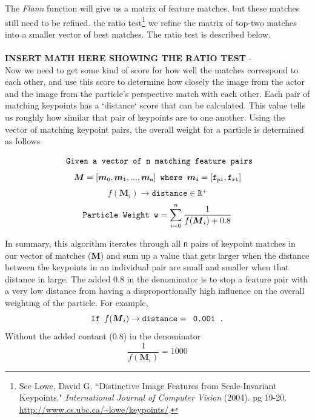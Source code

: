 \documentclass[a4paper,11pt]{article}
\begin{document}
 The \emph{Flann} function will give us a matrix of feature matches, but these matches still need to be refined. the ratio test\footnote{See Lowe, David G. ``Distinctive Image Features from Scale-Invariant Keypoints." {\it International Journal of Computer Vision} (2004). pg 19-20.  \url{http://www.cs.ubc.ca/~lowe/keypoints/}.} we refine the matrix of top-two matches into a smaller vector of best matches. The ratio test is described below.
\\ \\
 \textbf{INSERT MATH HERE SHOWING THE RATIO TEST}
-\\
  Now we need to get some kind of score for how well the matches correspond to each other, and use this score to determine how closely the image from the actor and the image from the particle's perspective match with each other. Each pair of matching keypoints has a `distance` score that can be calculated. This value tells us roughly how similar that pair of keypoints are to one another. Using the vector of matching keypoint pairs, the overall weight for a particle is determined as follows

\[  \verb. Given a vector of . \mathtt{n} \verb. matching feature pairs. \]
\[  \boldsymbol{M} = \mathtt{ [\boldsymbol{m}_0, \boldsymbol{m}_1, ... , \boldsymbol{m}_n} ]  \verb. where . \boldsymbol{m_i} = \mathtt{ \mathtt{[f_{pi}, f_{ri}]} }   \]
\[  f(\boldsymbol{M}_i) \to \mathtt{distance} \in \mathtt{R^+}   \]
\[  \verb.Particle Weight . \mathtt{w} = \sum_{i=0}^{n} \frac 1{f(\boldsymbol{M}_i) + 0.8} \]

In summary, this algorithm iterates through all \texttt{n} pairs of keypoint matches in our vector of matches (\textbf{M}) and sum up a value that gets larger when the distance between the keypoints in an individual pair are small and smaller when that distance in large. The added 0.8 in the denominator is to stop a feature pair with a very low distance from having a disproportionally high influence on the overall weighting of the particle. For example,
\[ \verb.If . f(\boldsymbol{M}_i) \to \mathtt{distance} = \verb, 0.001 ., \]
Without the added contant (0.8) in the denominator
\[ \frac 1{f(\boldsymbol{M}_i)} = 1000\]
\end{document}
